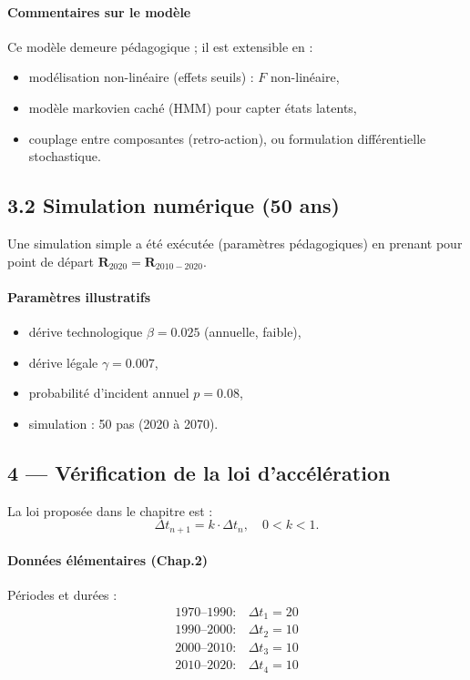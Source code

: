 \documentclass[12pt,a4paper]{article}
\begin{document}
\paragraph{Commentaires sur le modèle}
Ce modèle demeure pédagogique ; il est extensible en :
\begin{itemize}
  \item modélisation non-linéaire (effets seuils) : $F$ non-linéaire,
  \item modèle markovien caché (HMM) pour capter états latents,
  \item couplage entre composantes (retro-action), ou formulation différentielle stochastique.
\end{itemize}

\subsection{3.2 Simulation numérique (50 ans)}
Une simulation simple a été exécutée (paramètres pédagogiques) en prenant pour point de départ $\mathbf{R}_{2020}=\mathbf{R}_{2010-2020}$.

\paragraph{Paramètres illustratifs}
\begin{itemize}
  \item dérive technologique $\beta = 0.025$ (annuelle, faible),
  \item dérive légale $\gamma = 0.007$,
  \item probabilité d'incident annuel $p=0.08$,
  \item simulation : 50 pas (2020 à 2070).
\end{itemize}



\subsection{4 — Vérification de la loi d'accélération}
La loi proposée dans le chapitre est :
\[
\Delta t_{n+1} = k \cdot \Delta t_n, \quad 0<k<1.
\]

\paragraph{Données élémentaires (Chap.2)} Périodes et durées :
\[
\begin{array}{ll}
1970\text{--}1990: & \Delta t_1 = 20 \\
1990\text{--}2000: & \Delta t_2 = 10 \\
2000\text{--}2010: & \Delta t_3 = 10 \\
2010\text{--}2020: & \Delta t_4 = 10 \\
\end{array}
\]
\end{document}
